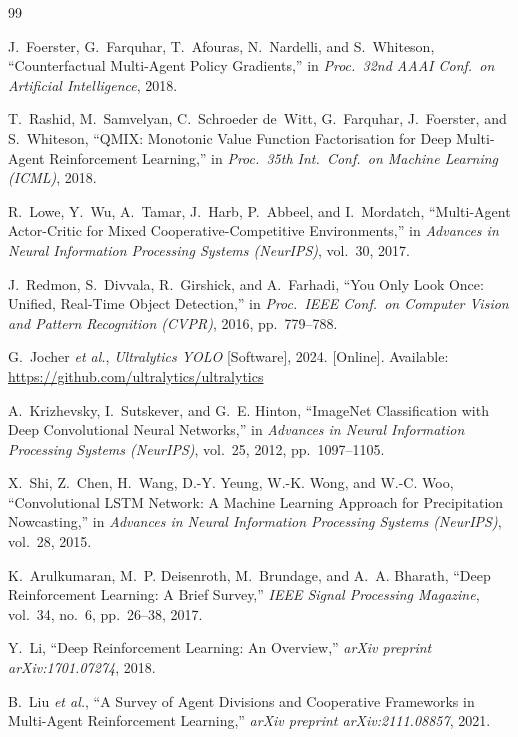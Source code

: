 \begin{thebibliography}{99}

J.~Foerster, G.~Farquhar, T.~Afouras, N.~Nardelli, and S.~Whiteson,
``Counterfactual Multi-Agent Policy Gradients,''
in \emph{Proc.\ 32nd AAAI Conf.\ on Artificial Intelligence}, 2018.

T.~Rashid, M.~Samvelyan, C.~Schroeder de~Witt, G.~Farquhar, J.~Foerster,
and S.~Whiteson,
``QMIX: Monotonic Value Function Factorisation for Deep Multi-Agent
Reinforcement Learning,''
in \emph{Proc.\ 35th Int.\ Conf.\ on Machine Learning (ICML)}, 2018.

R.~Lowe, Y.~Wu, A.~Tamar, J.~Harb, P.~Abbeel, and I.~Mordatch,
``Multi-Agent Actor-Critic for Mixed Cooperative-Competitive
Environments,''
in \emph{Advances in Neural Information Processing Systems (NeurIPS)},
vol.~30, 2017.


J.~Redmon, S.~Divvala, R.~Girshick, and A.~Farhadi,
``You Only Look Once: Unified, Real-Time Object Detection,''
in \emph{Proc.\ IEEE Conf.\ on Computer Vision and Pattern Recognition
(CVPR)}, 2016, pp.~779--788.

G.~Jocher \emph{et al.},
\emph{Ultralytics YOLO} [Software], 2024.
[Online]. Available: \url{https://github.com/ultralytics/ultralytics}

A.~Krizhevsky, I.~Sutskever, and G.~E. Hinton,
``ImageNet Classification with Deep Convolutional Neural Networks,''
in \emph{Advances in Neural Information Processing Systems (NeurIPS)},
vol.~25, 2012, pp.~1097--1105.

X.~Shi, Z.~Chen, H.~Wang, D.-Y. Yeung, W.-K. Wong, and W.-C. Woo,
``Convolutional LSTM Network: A Machine Learning Approach for Precipitation
Nowcasting,''
in \emph{Advances in Neural Information Processing Systems (NeurIPS)},
vol.~28, 2015.


K.~Arulkumaran, M.~P. Deisenroth, M.~Brundage, and A.~A. Bharath,
``Deep Reinforcement Learning: A Brief Survey,''
\emph{IEEE Signal Processing Magazine}, vol.~34, no.~6, pp.~26--38, 2017.

Y.~Li,
``Deep Reinforcement Learning: An Overview,''
\emph{arXiv preprint arXiv:1701.07274}, 2018.

B.~Liu \emph{et al.},
``A Survey of Agent Divisions and Cooperative Frameworks in Multi-Agent
Reinforcement Learning,''
\emph{arXiv preprint arXiv:2111.08857}, 2021.

\end{thebibliography}


